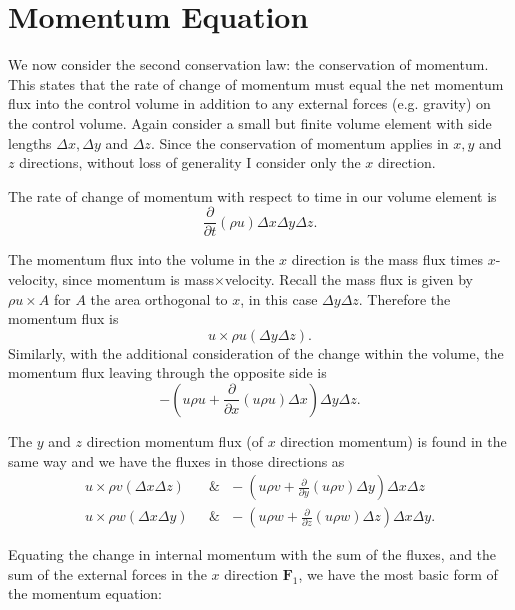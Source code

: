 \section{Momentum Equation}

We now consider the second conservation law: the conservation of momentum.
This states that the rate of change of momentum must equal the net momentum flux into the control volume in addition to any external forces (e.g. gravity) on the control volume.
Again consider a small but finite volume element with side lengths $\Delta x, \Delta y$ and $\Delta z$.
Since the conservation of momentum applies in $x,y$ and $z$ directions, without loss of generality I consider only the $x$ direction.

The rate of change of momentum with respect to time in our volume element is
\begin{equation*} \frac{\partial }{\partial t} \left ( \rho u \right) \Delta x \Delta y \Delta z .\end{equation*}

The momentum flux into the volume in the $x$ direction is the mass flux times $x$-velocity, since momentum is mass$\times$velocity.
Recall the mass flux is given by $\rho u \times A$ for $A$ the area orthogonal to $x$, in this case $\Delta y \Delta z$.
Therefore the momentum flux is
\begin{equation*} u \times \rho u (\Delta y \Delta z) .\end{equation*}
Similarly, with the additional consideration of the change within the volume, the momentum flux leaving through the opposite side is
\begin{equation*} - \left ( u\rho u + \frac{\partial}{\partial x} \left( u\rho u\right ) \Delta x \right ) \Delta y \Delta z .\end{equation*}

The $y$ and $z$ direction momentum flux (of $x$ direction momentum) is found in the same way and we have the fluxes in those directions as
\begin{align*} u \times \rho v (\Delta x \Delta z) & ~~~\& ~~~ - \left ( u\rho v + \frac{\partial}{\partial y} \left( u\rho v\right ) \Delta y \right ) \Delta x \Delta z \\
u \times \rho w (\Delta x \Delta y) & ~~~\& ~~~ - \left ( u\rho w + \frac{\partial}{\partial z} \left( u\rho w\right ) \Delta z \right ) \Delta x \Delta y . \end{align*}

Equating the change in internal momentum with the sum of the fluxes, and the sum of the external forces in the $x$ direction $\mathbf{F}_1$, we have the most basic form of the momentum equation:

